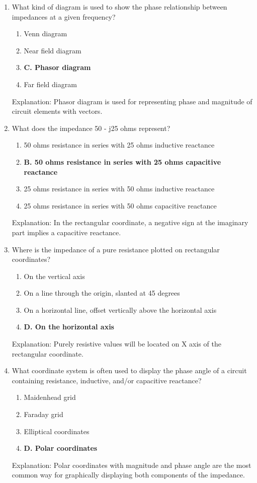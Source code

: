 \begin{enumerate}
      \item What kind of diagram is used to show the phase relationship between impedances at a given frequency?
       \begin{enumerate}
         \item  Venn diagram
        \item  Near field diagram
         \item \textbf{C. Phasor diagram}
      \item  Far field diagram
      \end{enumerate}
         \textcolor{myred}{Explanation:}
         Phasor diagram is used for representing phase and magnitude of circuit elements with vectors.
          
    \item What does the impedance 50 - j25 ohms represent?
      \begin{enumerate}
      \item  50 ohms resistance in series with 25 ohms inductive reactance
         \item \textbf{B. 50 ohms resistance in series with 25 ohms capacitive reactance}
        \item  25 ohms resistance in series with 50 ohms inductive reactance
         \item  25 ohms resistance in series with 50 ohms capacitive reactance
     \end{enumerate}
   \textcolor{myred}{Explanation:}
   In the rectangular coordinate, a negative sign at the imaginary part implies a capacitive reactance.
        
    \item Where is the impedance of a pure resistance plotted on rectangular coordinates?
       \begin{enumerate}
         \item  On the vertical axis
          \item  On a line through the origin, slanted at 45 degrees
        \item  On a horizontal line, offset vertically above the horizontal axis
       \item \textbf{D. On the horizontal axis}
       \end{enumerate}
       \textcolor{myred}{Explanation:}
      Purely resistive values will be located on X axis of the rectangular coordinate.

    \item What coordinate system is often used to display the phase angle of a circuit containing resistance, inductive, and/or capacitive reactance?
     \begin{enumerate}
      \item  Maidenhead grid
        \item  Faraday grid
      \item  Elliptical coordinates
      \item \textbf{D. Polar coordinates}
      \end{enumerate}
     \textcolor{myred}{Explanation:}
        Polar coordinates with magnitude and phase angle are the most common way for graphically displaying both components of the impedance.
   

\end{enumerate}
